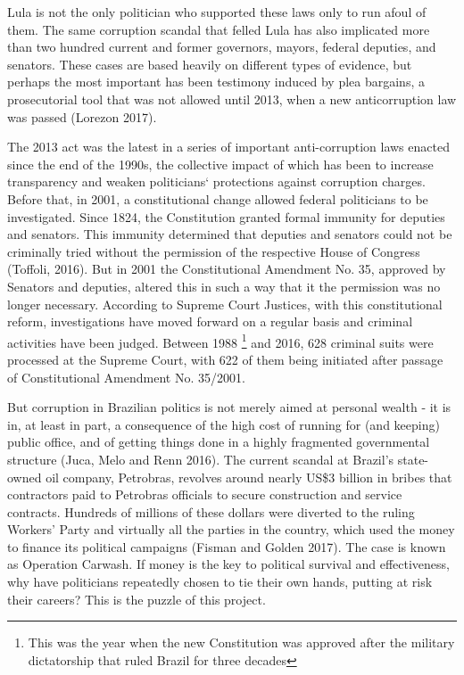 \documentclass[12pt,a4paper]{article}
\begin{document}
Lula is not the only politician who supported these laws only to run afoul of them. The same corruption scandal that felled Lula has also implicated more than two hundred current and former governors, mayors, federal deputies, and senators. These cases are based heavily on different types of evidence, but perhaps the most important has been testimony induced by plea bargains, a prosecutorial tool that was not allowed until 2013, when a new anticorruption law was passed (Lorezon 2017). 

The 2013 act was the latest in a series of important anti-corruption laws enacted since the end of the 1990s, the collective impact of which has been to increase transparency and weaken politicians` protections against corruption charges. 
Before that, in 2001, a constitutional change allowed federal politicians to be investigated. Since 1824, the Constitution granted formal immunity for deputies and senators. This immunity determined that deputies and senators could not be criminally tried without the permission of the respective House of Congress (Toffoli, 2016). But in 2001 the Constitutional Amendment No. 35, approved by Senators and deputies, altered this in such a way that it the permission was no longer necessary. According to Supreme Court Justices, with this constitutional reform, investigations have moved forward on a regular basis and criminal activities have been judged. Between 1988 \footnote{This was the year when the new Constitution was approved after the military dictatorship that ruled Brazil for three decades} and 2016, 628 criminal suits were processed at the Supreme Court, with 622 of them being initiated after passage of Constitutional Amendment No. 35/2001.

But corruption in Brazilian politics is not merely aimed at personal wealth - it is in, at least in part, a consequence of the high cost of running for (and keeping) public office, and of getting things done in a highly fragmented governmental structure (Juca, Melo and Renn 2016). The current scandal at Brazil's state-owned oil company, Petrobras, revolves around nearly US\$3 billion in bribes that contractors paid to Petrobras officials to secure construction and service contracts. Hundreds of millions of these dollars were diverted to the ruling Workers' Party and virtually all the parties in the country, which used the money to  finance its political campaigns (Fisman and Golden 2017). The case is known as Operation Carwash. If money is the key to political survival and effectiveness, why have politicians repeatedly chosen to tie their own hands, putting at risk their careers?  This is the puzzle of this project.\\
\end{document}
